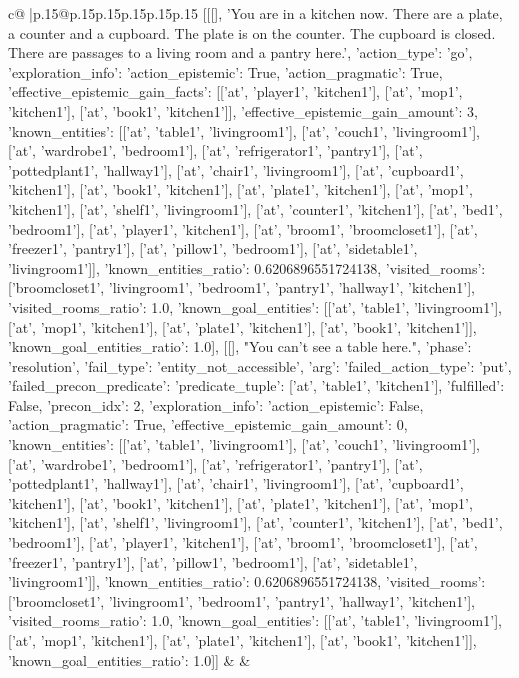 \documentclass{article}
\begin{document}
{\begin{supertabular}{c@{$\;$}|p{.15\linewidth}@{}p{.15\linewidth}p{.15\linewidth}p{.15\linewidth}p{.15\linewidth}p{.15\linewidth}}
{{{	 [[[], 'You are in a kitchen now. There are a plate, a counter and a cupboard. The plate is on the counter. The cupboard is closed. There are passages to a living room and a pantry here.', {'action_type': 'go', 'exploration_info': {'action_epistemic': True, 'action_pragmatic': True, 'effective_epistemic_gain_facts': [['at', 'player1', 'kitchen1'], ['at', 'mop1', 'kitchen1'], ['at', 'book1', 'kitchen1']], 'effective_epistemic_gain_amount': 3, 'known_entities': [['at', 'table1', 'livingroom1'], ['at', 'couch1', 'livingroom1'], ['at', 'wardrobe1', 'bedroom1'], ['at', 'refrigerator1', 'pantry1'], ['at', 'pottedplant1', 'hallway1'], ['at', 'chair1', 'livingroom1'], ['at', 'cupboard1', 'kitchen1'], ['at', 'book1', 'kitchen1'], ['at', 'plate1', 'kitchen1'], ['at', 'mop1', 'kitchen1'], ['at', 'shelf1', 'livingroom1'], ['at', 'counter1', 'kitchen1'], ['at', 'bed1', 'bedroom1'], ['at', 'player1', 'kitchen1'], ['at', 'broom1', 'broomcloset1'], ['at', 'freezer1', 'pantry1'], ['at', 'pillow1', 'bedroom1'], ['at', 'sidetable1', 'livingroom1']], 'known_entities_ratio': 0.6206896551724138, 'visited_rooms': ['broomcloset1', 'livingroom1', 'bedroom1', 'pantry1', 'hallway1', 'kitchen1'], 'visited_rooms_ratio': 1.0, 'known_goal_entities': [['at', 'table1', 'livingroom1'], ['at', 'mop1', 'kitchen1'], ['at', 'plate1', 'kitchen1'], ['at', 'book1', 'kitchen1']], 'known_goal_entities_ratio': 1.0}}], [[], "You can't see a table here.", {'phase': 'resolution', 'fail_type': 'entity_not_accessible', 'arg': {'failed_action_type': 'put', 'failed_precon_predicate': {'predicate_tuple': ['at', 'table1', 'kitchen1'], 'fulfilled': False, 'precon_idx': 2}}, 'exploration_info': {'action_epistemic': False, 'action_pragmatic': True, 'effective_epistemic_gain_amount': 0, 'known_entities': [['at', 'table1', 'livingroom1'], ['at', 'couch1', 'livingroom1'], ['at', 'wardrobe1', 'bedroom1'], ['at', 'refrigerator1', 'pantry1'], ['at', 'pottedplant1', 'hallway1'], ['at', 'chair1', 'livingroom1'], ['at', 'cupboard1', 'kitchen1'], ['at', 'book1', 'kitchen1'], ['at', 'plate1', 'kitchen1'], ['at', 'mop1', 'kitchen1'], ['at', 'shelf1', 'livingroom1'], ['at', 'counter1', 'kitchen1'], ['at', 'bed1', 'bedroom1'], ['at', 'player1', 'kitchen1'], ['at', 'broom1', 'broomcloset1'], ['at', 'freezer1', 'pantry1'], ['at', 'pillow1', 'bedroom1'], ['at', 'sidetable1', 'livingroom1']], 'known_entities_ratio': 0.6206896551724138, 'visited_rooms': ['broomcloset1', 'livingroom1', 'bedroom1', 'pantry1', 'hallway1', 'kitchen1'], 'visited_rooms_ratio': 1.0, 'known_goal_entities': [['at', 'table1', 'livingroom1'], ['at', 'mop1', 'kitchen1'], ['at', 'plate1', 'kitchen1'], ['at', 'book1', 'kitchen1']], 'known_goal_entities_ratio': 1.0}}]] 
	  } 
	   } 
	   } 
	 & & \\ 
 


\end{supertabular}}
\end{document}
